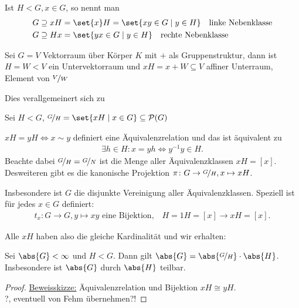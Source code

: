 \begin{definition}
	Ist $H < G, x \in G$, so nennt man
	\begin{align*}
	G \supseteq x H &= \set{x}H = \set{xy \in G \mid y \in H} \quad \text{linke Nebenklasse}\\
	G \supseteq H x &= \set{yx \in G \mid y \in H} \quad \text{rechte Nebenklasse}
	\end{align*}
\end{definition}
\begin{example}
	Sei $G = V$ Vektorraum über Körper $K$ mit $+$ als Gruppenstruktur, dann ist $H = W < V$ ein Untervektorraum und $xH = x + W \subseteq V$ affiner Unterraum, Element von $\lnkset{V}{W}$
\end{example}
Dies verallgemeinert sich zu
\begin{definition}
	Sei $H < G$, $\lnkset{G}{H} = \set{x H \mid x \in G} \subseteq \powerset(G)$
\end{definition}
\begin{remark}
	$xH = yH \Leftrightarrow x \sim y$ definiert eine Äquivalenzrelation und das ist äquivalent zu
	\begin{align*}
		\exists h \in H: x = yh \Leftrightarrow y^{-1}y \in H.
	\end{align*}
	Beachte dabei $\lnkset{G}{H} = \lnkset{G}{N}$ ist die Menge aller Äquivalenzklassen $xH = [x]$. Desweiteren gibt es die kanonische Projektion $\pi\colon G \to \lnkset{G}{H},x \mapsto xH$.
	
	Insbesondere ist $G$ die disjunkte Vereinigung aller Äquivalenzklassen. Speziell ist für jedes $x \in G$ definiert:
	\begin{align*}
		t_x\colon G \to G, y \mapsto xy \text{ eine Bijektion,} \quad H = 1H = [x] \to xH = [x].
	\end{align*}
\end{remark}

Alle $xH$ haben also die gleiche Kardinalität und wir erhalten:
\begin{proposition}
	\label{1_2_9_lagrange}
	Sei $\abs{G} < \infty$ und $H < G$. Dann gilt $\abs{G} = \abs{\lnkset{G}{H}}\cdot \abs{H}$. Insbesondere ist $\abs{G}$ durch $\abs{H}$ teilbar.
\end{proposition}
\begin{proof}
	\ul{Beweisskizze:} Äquivalenzrelation und Bijektion $xH \cong yH$.\\
	?, eventuell von Fehm übernehmen?!
\end{proof}

